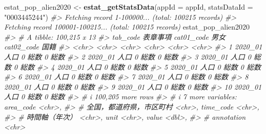 \documentclass[
  xelatex, ja=standard]{bxjsbook}
\newenvironment{Shaded}{\begin{snugshade}}{\end{snugshade}}
\newcommand{\AttributeTok}[1]{\textcolor[rgb]{0.13,0.29,0.53}{#1}}
\newcommand{\CommentTok}[1]{\textcolor[rgb]{0.56,0.35,0.01}{\textit{#1}}}
\newcommand{\FunctionTok}[1]{\textcolor[rgb]{0.13,0.29,0.53}{\textbf{#1}}}
\newcommand{\NormalTok}[1]{#1}
\newcommand{\OtherTok}[1]{\textcolor[rgb]{0.56,0.35,0.01}{#1}}
\newcommand{\StringTok}[1]{\textcolor[rgb]{0.31,0.60,0.02}{#1}}
\theoremstyle{definition}
\theoremstyle{definition}
\theoremstyle{definition}
\theoremstyle{definition}
\theoremstyle{remark}
\begin{document}
\begin{Shaded}
\begin{Highlighting}[]
\NormalTok{estat\_pop\_alien2020 }\OtherTok{\textless{}{-}} \FunctionTok{estat\_getStatsData}\NormalTok{(}\AttributeTok{appId =}\NormalTok{ appId, }\AttributeTok{statsDataId =} \StringTok{"0003445244"}\NormalTok{)}
\CommentTok{\#\textgreater{} Fetching record 1{-}100000... (total: 100215 records)}
\CommentTok{\#\textgreater{} Fetching record 100001{-}100215... (total: 100215 records)}
\NormalTok{estat\_pop\_alien2020}
\CommentTok{\#\textgreater{} \# A tibble: 100,215 x 13}
\CommentTok{\#\textgreater{}    tab\_code 表章事項 cat01\_code 男女  cat02\_code 国籍 }
\CommentTok{\#\textgreater{}    \textless{}chr\textgreater{}    \textless{}chr\textgreater{}    \textless{}chr\textgreater{}      \textless{}chr\textgreater{} \textless{}chr\textgreater{}      \textless{}chr\textgreater{}}
\CommentTok{\#\textgreater{}  1 2020\_01  人口     0          総数  0          総数 }
\CommentTok{\#\textgreater{}  2 2020\_01  人口     0          総数  0          総数 }
\CommentTok{\#\textgreater{}  3 2020\_01  人口     0          総数  0          総数 }
\CommentTok{\#\textgreater{}  4 2020\_01  人口     0          総数  0          総数 }
\CommentTok{\#\textgreater{}  5 2020\_01  人口     0          総数  0          総数 }
\CommentTok{\#\textgreater{}  6 2020\_01  人口     0          総数  0          総数 }
\CommentTok{\#\textgreater{}  7 2020\_01  人口     0          総数  0          総数 }
\CommentTok{\#\textgreater{}  8 2020\_01  人口     0          総数  0          総数 }
\CommentTok{\#\textgreater{}  9 2020\_01  人口     0          総数  0          総数 }
\CommentTok{\#\textgreater{} 10 2020\_01  人口     0          総数  0          総数 }
\CommentTok{\#\textgreater{} \# i 100,205 more rows}
\CommentTok{\#\textgreater{} \# i 7 more variables: area\_code \textless{}chr\textgreater{},}
\CommentTok{\#\textgreater{} \#   \textasciigrave{}全国，都道府県，市区町村\textasciigrave{} \textless{}chr\textgreater{}, time\_code \textless{}chr\textgreater{},}
\CommentTok{\#\textgreater{} \#   \textasciigrave{}時間軸（年次）\textasciigrave{} \textless{}chr\textgreater{}, unit \textless{}chr\textgreater{}, value \textless{}dbl\textgreater{},}
\CommentTok{\#\textgreater{} \#   annotation \textless{}chr\textgreater{}}
\end{Highlighting}
\end{Shaded}
\end{document}
